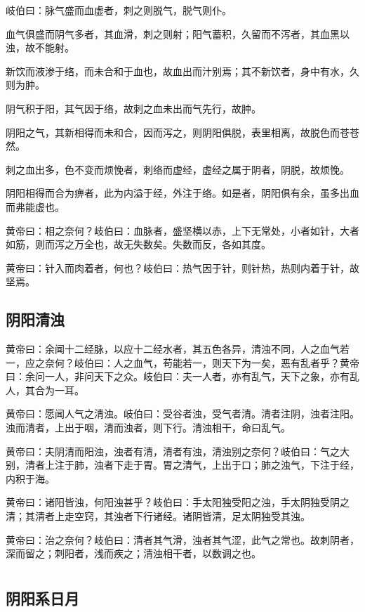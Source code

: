 \documentclass[12pt,UTF8]{ctexbook}
\begin{document}
	岐伯曰：脉气盛而血虚者，刺之则脱气，脱气则仆。
	
	血气俱盛而阴气多者，其血滑，刺之则射；阳气蓄积，久留而不泻者，其血黑以浊，故不能射。
	
	新饮而液渗于络，而未合和于血也，故血出而汁别焉；其不新饮者，身中有水，久则为肿。
	
	阴气积于阳，其气因于络，故刺之血未出而气先行，故肿。
	
	阴阳之气，其新相得而未和合，因而泻之，则阴阳俱脱，表里相离，故脱色而苍苍然。
	
	刺之血出多，色不变而烦悗者，刺络而虚经，虚经之属于阴者，阴脱，故烦悗。
	
	阴阳相得而合为痹者，此为内溢于经，外注于络。如是者，阴阳俱有余，虽多出血而弗能虚也。
	
	黄帝曰：相之奈何？岐伯曰：血脉者，盛坚横以赤，上下无常处，小者如针，大者如筋，则而泻之万全也，故无失数矣。失数而反，各如其度。
	
	黄帝曰：针入而肉着者，何也？岐伯曰：热气因于针，则针热，热则内着于针，故坚焉。
	\chapter{阴阳清浊}
	
	黄帝曰：余闻十二经脉，以应十二经水者，其五色各异，清浊不同，人之血气若一，应之奈何？岐伯曰：人之血气，苟能若一，则天下为一矣，恶有乱者乎？黄帝曰：余问一人，非问天下之众。岐伯曰：夫一人者，亦有乱气，天下之象，亦有乱人，其合为一耳。
	
	黄帝曰：愿闻人气之清浊。岐伯曰：受谷者浊，受气者清。清者注阴，浊者注阳。浊而清者，上出于咽，清而浊者，则下行。清浊相干，命曰乱气。
	
	黄帝曰：夫阴清而阳浊，浊者有清，清者有浊，清浊别之奈何？岐伯曰：气之大别，清者上注于肺，浊者下走于胃。胃之清气，上出于口；肺之浊气，下注于经，内积于海。
	
	黄帝曰：诸阳皆浊，何阳浊甚乎？岐伯曰：手太阳独受阳之浊，手太阴独受阴之清；其清者上走空窍，其浊者下行诸经。诸阴皆清，足太阴独受其浊。
	
	黄帝曰：治之奈何？岐伯曰：清者其气滑，浊者其气涩，此气之常也。故刺阴者，深而留之；刺阳者，浅而疾之；清浊相干者，以数调之也。
	
	\part{}
	\chapter{阴阳系日月}
	
\end{document}
